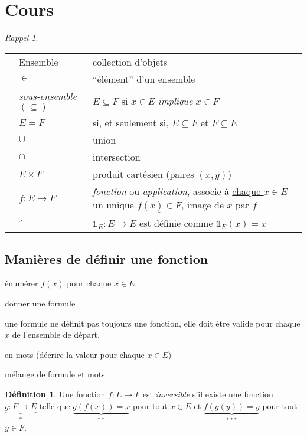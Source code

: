 \documentclass{report}
\newcounter{cours}
\newcommand*{\cours}{\section*{Cours \thecours}\stepcounter{cours}}
\theoremstyle{definition}
\newtheorem*{defin}{D\'efinition}
\theoremstyle{remark}
\newtheorem*{rappel}{Rappel}
\begin{document}
	\cours
	\begin{rappel}
		~

		\begin{tabularx}{.9\textwidth}{cl>{\raggedright\arraybackslash}X}
			\textbullet&Ensemble&collection d'objets\\
			\textbullet&$\in$&``\'el\'ement'' d'un ensemble\\
			\textbullet&\emph{sous-ensemble} $(\subseteq)$&$E \subseteq F$ si $x \in E$ \emph{implique} $x \in F$\\
			\textbullet&$E=F$&si, et seulement si, $E \subseteq F$ et $F \subseteq E$\\
			\textbullet&$\cup$&union\\
			&$\cap$&intersection\\
			\textbullet&$E \times F$&produit cart\'esien (paires $(x,y)$)\\
			\textbullet&$f:E \to F$&\emph{fonction} ou \emph{application}, associe \`a \underline{chaque $x \in E$} un unique $\underline{f(x) \in F}$, image de $x$ par $f$\\
			\textbullet&$\mathds{1}$&$\mathds{1}_E:E \to E$ est d\'efinie comme $\mathds{1}_E(x)=x$
		\end{tabularx}
	\end{rappel}


	\subsection{Mani\`eres de d\'efinir une fonction}
	\begin{ulist}[noitemsep]
		\item \'enum\'erer $f(x)$ pour chaque $x \in E$
		\item donner une formule

		une formule ne d\'efinit pas toujours une fonction, elle doit \^etre valide pour chaque $x$ de l'ensemble de d\'epart.
		\item en mots (d\'ecrire la valeur pour chaque $x \in E$)
		\item m\'elange de formule et mots
	\end{ulist}

	\begin{defin}
		Une fonction $f:E \to F$ est \emph{inversible} s'il existe une fonction $\underbrace{g:F \to E}_{*}$ telle que $\underbrace{g(f(x))=x}_{**}$ pour tout $x \in E$ et $\underbrace{f(g(y))=y}_{***}$ pour tout $y \in F$.
	\end{defin}
\end{document}
